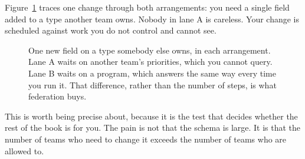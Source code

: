 Figure~\ref{fig:ch01-one-field} traces one change through both arrangements:
you need a single field added to a type another team owns. Nobody in lane A is
careless. Your change is scheduled against work you do not control and cannot
see.
%

\begin{figure}
  \centering
  
  \caption{One new field on a type somebody else owns, in each arrangement.
  Lane A waits on another team's priorities, which you cannot query. Lane B
  waits on a program, which answers the same way every time you run it. That
  difference, rather than the number of steps, is what federation buys.}
  \label{fig:ch01-one-field}
\end{figure}

This is worth being precise about, because it is the test that decides whether
the rest of the book is for you. The pain is not that the schema is large. It
is that the number of teams who need to change it exceeds the number of teams
who are allowed to.
